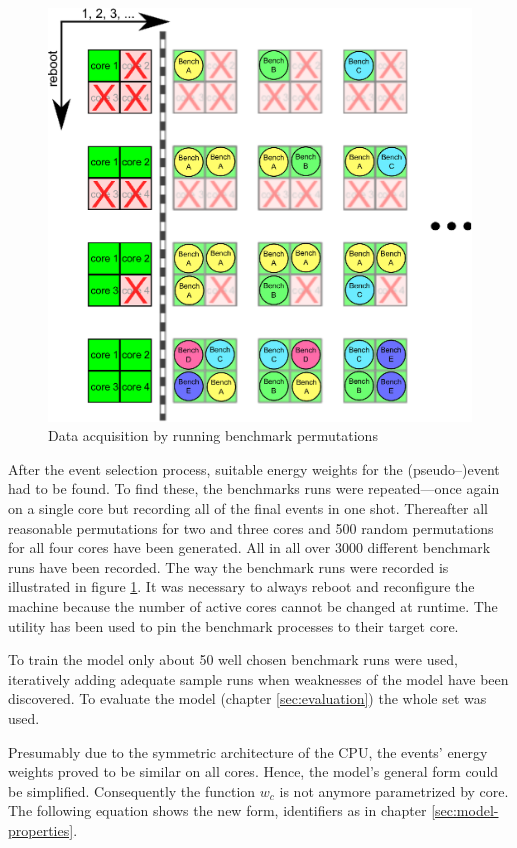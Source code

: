 \begin{figure}
  \centering
    \includegraphics[width=\textwidth]{fig/run-benchmarks.eps}
  \caption{Data acquisition by running benchmark permutations}
  \label{fig:run-benchmarks}
\end{figure}

After the event selection process, suitable energy weights for the
(pseudo--)event had to be found. To find these, the benchmarks runs were
repeated---once again on a single core but recording all of the final events in
one shot. Thereafter all reasonable permutations for two and three cores and 500
random permutations for all four cores have been generated. All in all over 3000
different benchmark runs have been recorded. The way the benchmark runs were
recorded is illustrated in figure \ref{fig:run-benchmarks}. It was necessary to
always reboot and reconfigure the machine because the number of active cores
cannot be changed at runtime. The \cite{man:taskset} utility has
been used to pin the benchmark processes to their target core.

To train the model only about 50 well chosen benchmark runs were used,
iteratively adding adequate sample runs when weaknesses of the model have been
discovered. To evaluate the model (chapter \ref{sec:evaluation}) the whole set
was used.

Presumably due to the symmetric architecture of the CPU, the events' energy
weights proved to be similar on all cores. Hence, the model's general form could
be simplified. Consequently the function $w_c$ is not anymore parametrized by
core. The following equation shows the new form, identifiers as in chapter
\ref{sec:model-properties}.

